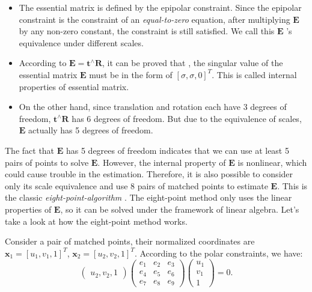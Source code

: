 \begin{itemize}
	\item The essential matrix is defined by the epipolar constraint. Since the epipolar constraint is the constraint of an\textit{ equal-to-zero }equation, after multiplying $\mathbf{E}$ by any non-zero constant, the constraint is still satisfied. We call this $\mathbf{E}$ 's equivalence under different scales.
	\item According to $\mathbf{E} = \mathbf{t}^ \wedge \mathbf{R}$, it can be proved that  {\cite{Hartley2003}}, the singular value of the essential matrix $\mathbf{E}$ must be in the form of $[\sigma, \sigma, 0]^T$. This is called internal properties of essential matrix.
	\item On the other hand, since translation and rotation each have 3 degrees of freedom, $\mathbf{t}^\wedge \mathbf{R}$ has 6 degrees of freedom. But due to the equivalence of scales, $\mathbf{E}$ actually has 5 degrees of freedom.
\end{itemize}

The fact that $\mathbf{E}$ has 5 degrees of freedom indicates that we can use at least 5 pairs of points to solve $\mathbf{E}$. However, the internal property of $\mathbf{E}$ is nonlinear, which could cause trouble in the estimation. Therefore, it is also possible to consider only its scale equivalence and use 8 pairs of matched points to estimate $\mathbf{E}$. This is the classic \textit{eight-point-algorithm} {\cite{Hartley1997, Longuet-Higgins1987}}. The eight-point method only uses the linear properties of $\mathbf{E}$, so it can be solved under the framework of linear algebra. Let's take a look at how the eight-point method works.

Consider a pair of matched points, their normalized coordinates are $\mathbf{x}_{1}=[u_{1},v_{1},1]^T$, $\mathbf{x}_{2}=[u_{2},v_{2},1]^T$. According to the polar constraints, we have:
\begin{equation}
\begin{pmatrix} 
u_{2},v_{2},1
\end{pmatrix}
\begin{pmatrix}
 e_{1} & e_{2} & e_{3}\\ 
 e_{4} & e_{5} & e_{6}\\ 
 e_{7} & e_{8} & e_{9} 
\end{pmatrix}
\begin{pmatrix} 
u_{1}\\v_{1}\\1
\end{pmatrix}
=0.
\end{equation}

